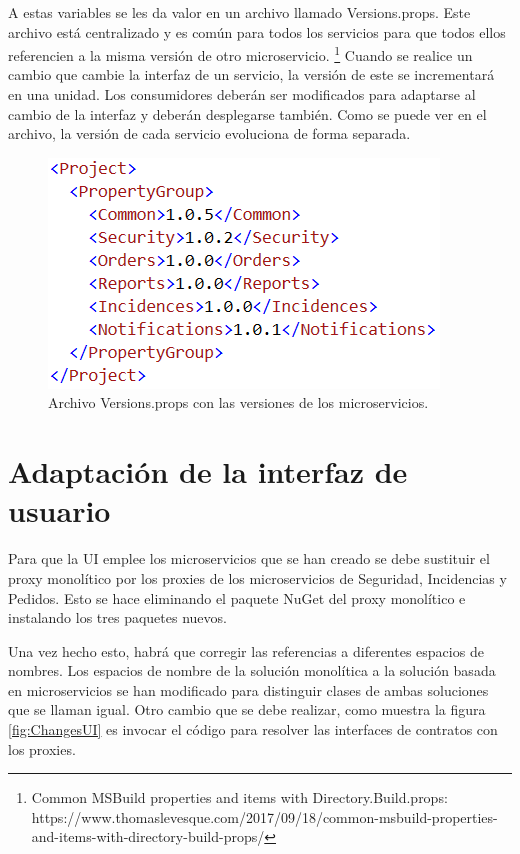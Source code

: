 \documentclass[11pt,spanish,listoffigures]{tfgetsinf}
\begin{document}
A estas variables se les da valor en un archivo llamado Versions.props. Este archivo está centralizado y es común para todos los servicios para que todos ellos referencien a la misma versión de otro microservicio. \footnote{ Common MSBuild properties and items with Directory.Build.props: https://www.thomaslevesque.com/2017/09/18/common-msbuild-properties-and-items-with-directory-build-props/} Cuando se realice un cambio que cambie la interfaz de un servicio, la versión de este se incrementará en una unidad. Los consumidores deberán ser modificados para adaptarse al cambio de la interfaz y deberán desplegarse también. Como se puede ver en el archivo, la versión de cada servicio evoluciona de forma separada.

\begin{figure}[h]
\centering
\includegraphics[scale=0.9]{Versionsprops}
\caption{Archivo Versions.props con las versiones de los microservicios.}
\end{figure}

\newpage

\section{Adaptación de la interfaz de usuario}

Para que la UI emplee los microservicios que se han creado se debe sustituir el proxy monolítico por los proxies de los microservicios de Seguridad, Incidencias y Pedidos. Esto se hace eliminando el paquete NuGet del proxy monolítico e instalando los tres paquetes nuevos.

Una vez hecho esto, habrá que corregir las referencias a diferentes espacios de nombres. Los espacios de nombre de la solución monolítica a la solución basada en microservicios se han modificado para distinguir clases de ambas soluciones que se llaman igual. Otro cambio que se debe realizar, como muestra la figura \ref{fig:ChangesUI} es invocar el código para resolver las interfaces de contratos con los proxies.
\end{document}

